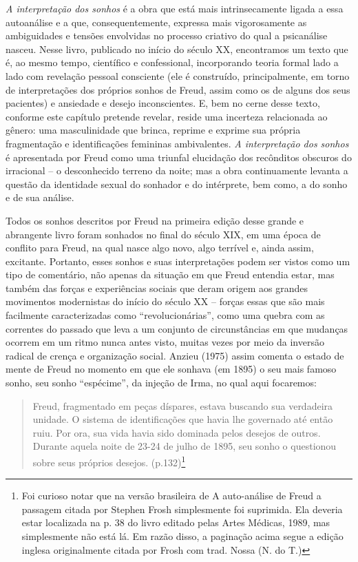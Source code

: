 \emph{A interpretação dos sonhos} é a obra que está mais intrinsecamente
ligada a essa autoanálise e a que, consequentemente, expressa mais
vigorosamente as ambiguidades e tensões envolvidas no processo criativo
do qual a psicanálise nasceu. Nesse livro, publicado no início do século
XX, encontramos um texto que é, ao mesmo tempo, científico e
confessional, incorporando teoria formal lado a lado com revelação
pessoal consciente (ele é construído, principalmente, em torno de
interpretações dos próprios sonhos de Freud, assim como os de alguns dos
seus pacientes) e ansiedade e desejo inconscientes. E, bem no cerne
desse texto, conforme este capítulo pretende revelar, reside uma
incerteza relacionada ao gênero: uma masculinidade que brinca, reprime e
exprime sua própria fragmentação e identificações femininas
ambivalentes. \emph{A interpretação dos sonhos} é apresentada por Freud
como uma triunfal elucidação dos recônditos obscuros do irracional -- o
desconhecido terreno da noite; mas a obra continuamente levanta a
questão da identidade sexual do sonhador e do intérprete, bem como, a do
sonho e de sua análise.

Todos os sonhos descritos por Freud na primeira edição desse grande e
abrangente livro foram sonhados no final do século XIX, em uma época de
conflito para Freud, na qual nasce algo novo, algo terrível e, ainda
assim, excitante. Portanto, esses sonhos e suas interpretações podem ser
vistos como um tipo de comentário, não apenas da situação em que Freud
entendia estar, mas também das forças e experiências sociais que deram
origem aos grandes movimentos modernistas do início do século XX --
forças essas que são mais facilmente caracterizadas como
``revolucionárias'', como uma quebra com as correntes do passado que
leva a um conjunto de circunstâncias em que mudanças ocorrem em um ritmo
nunca antes visto, muitas vezes por meio da inversão radical de crença e
organização social. Anzieu (1975) assim comenta o estado de mente de
Freud no momento em que ele sonhava (em 1895) o seu mais famoso sonho,
seu sonho ``espécime'', da injeção de Irma, no qual aqui focaremos:

\begin{quote}
Freud, fragmentado em peças díspares, estava buscando sua verdadeira
unidade. O sistema de identificações que havia lhe governado até então
ruiu. Por ora, sua vida havia sido dominada pelos desejos de outros.
Durante aquela noite de 23-24 de julho de 1895, seu sonho o questionou
sobre seus próprios desejos. (p.132)\footnote{Foi curioso notar que na
  versão brasileira de A auto-análise de Freud a passagem citada por
  Stephen Frosh simplesmente foi suprimida. Ela deveria estar localizada
  na p. 38 do livro editado pelas Artes Médicas, 1989, mas simplesmente
  não está lá. Em razão disso, a paginação acima segue a edição inglesa
  originalmente citada por Frosh com trad. Nossa (N. do T.)}
\end{quote}

